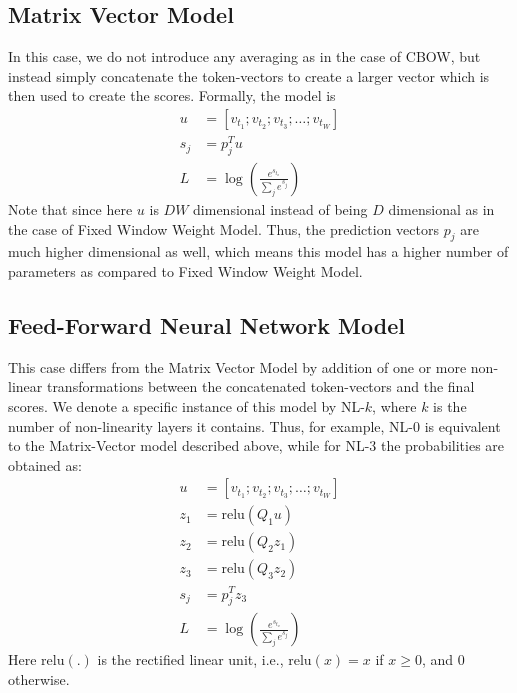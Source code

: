 \subsection{Matrix Vector Model}
In this case, we do not introduce any averaging as in the case of CBOW, but
instead simply concatenate the token-vectors to create a larger vector which is
then used to create the scores. Formally, the model is
\begin{align}
u &= [v_{t_1}; v_{t_2}; v_{t_3}; \ldots; v_{t_W}]\\
s_j &= p_j^Tu\\
L &= \log\left(\frac{e^{s_{t_o}}}{\sum_j{e^{s_j}}}\right)
\end{align}
Note that since here $u$ is $DW$ dimensional instead of being $D$ dimensional as
in the case of Fixed Window Weight Model. Thus, the prediction vectors $p_j$ are
much higher dimensional as well, which means this model has a higher number
of parameters as compared to Fixed Window Weight Model.

\subsection{Feed-Forward Neural Network Model}
\label{sec:nnlm}
This case differs from the Matrix Vector Model by addition of one or more
non-linear transformations between the concatenated token-vectors and the final
scores. We denote a specific instance of this model by NL-$k$, where $k$ is the
number of non-linearity layers it contains. Thus, for example, NL-$0$ is
equivalent to the Matrix-Vector model described above, while for NL-$3$ the
probabilities are obtained as:
\begin{align}
u &= [v_{t_1}; v_{t_2}; v_{t_3}; \ldots; v_{t_W}]\\
z_1 &= \text{relu}(Q_1u)\\
z_2 &= \text{relu}(Q_2z_1)\\
z_3 &= \text{relu}(Q_3z_2)\\
s_j &= p_j^Tz_3\\
L &= \log\left(\frac{e^{s_{t_o}}}{\sum_j{e^{s_j}}}\right)
\end{align}
Here $\text{relu}(.)$ is the rectified linear unit, i.e., $\text{relu}(x) = x$
if $x \geq 0$, and $0$ otherwise.

